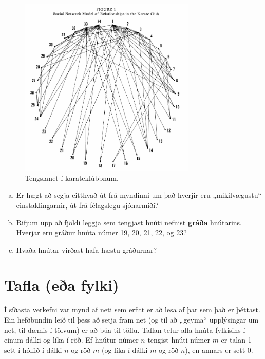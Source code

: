 \documentclass[b5paper,12pt]{book}
\begin{document}
\begin{figure}[h]
  \includegraphics[width=0.75\textwidth, center]{Myndir/Karateclub.png}
  \caption*{Tengslanet í karateklúbbnum.}
\end{figure}

\begin{enumerate}[(a)]
    \item Er hægt að segja eitthvað út frá myndinni um það hverjir eru „mikilvægustu“ einstaklingarnir, út frá félagslegu sjónarmiði? 
    \item Rifjum upp að fjöldi leggja sem tengjast hnúti nefnist \textbf{gráða} hnútarins. Hverjar eru gráður hnúta númer 19, 20, 21, 22, og 23?
    \item Hvaða hnútar virðast hafa hæstu gráðurnar?
\end{enumerate}

\section{Tafla (eða fylki)}
Í síðasta verkefni var mynd af neti sem erfitt er að lesa af þar sem það er þéttast. Ein hefðbundin leið til þess að setja fram net (og til að „geyma“ upplýsingar um net, til dæmis í tölvum) er að búa til töflu. Taflan telur alla hnúta fylkisins í einum dálki og líka í röð. Ef hnútur númer $n$ tengist hnúti númer $m$ er talan 1 sett í hólfið í dálki $n$ og röð $m$ (og líka í dálki $m$ og röð $n$), en annars er sett 0. 
\end{document}
